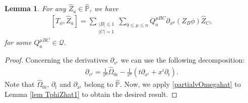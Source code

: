 \documentclass{article}
\newtheorem{lemma}{Lemma}[section]
\newcommand{\bbp}{{\mathbb P}}
\newcommand{\cQ}{{\mathcal Q}}
\begin{document}
%
\begin{lemma} \label{lem TphiZhat2}
For any $ \hat{ Z }_a \in \hat{ \bbp } $, we have
\begin{align*}
\left[ T_\phi , \hat{ Z }_a \right] = \sum_{ \substack{ | B | \leq 1 \\ | C | = 1 } } \sum_{ 0 \leq \mu \leq n } Q^{ \mu B C }_{ a } \partial_{ x^\mu } ( Z_B \phi ) \hat{ Z }_C ,
\end{align*}
for some $ Q^{ \mu B C }_a \in \cQ $.
\end{lemma}
\begin{proof}
Concerning the derivatives $ \partial_{ v^i } $ we can use the following decomposition:
\begin{align}
\partial_{ v^i } = \frac{ 1 }{ v^0 } \hat{ \Omega }_{ 0 i } - \frac{ 1 }{ v^0 } ( t \partial_{ x^i } + x^i \partial_t ) . \label{partialvOmegahat}
\end{align}
Note that $ \hat{ \Omega }_{ 0 i } $, $ \partial_t $ and $ \partial_{ x^i } $ belong to $ \hat{ \bbp } $. Now, we apply \eqref{partialvOmegahat} to Lemma \ref{lem TphiZhat1} to obtain the desired result.
\end{proof}
\end{document}
